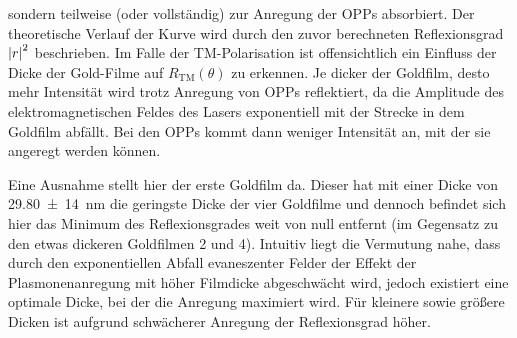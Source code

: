 sondern teilweise (oder vollständig) zur Anregung der OPPs absorbiert. Der theoretische Verlauf der Kurve wird durch den zuvor berechneten Reflexionsgrad $\abs{r}^2$ beschrieben. Im Falle der TM-Polarisation ist offensichtlich ein Einfluss der Dicke der Gold-Filme auf $R_{\mathrm{TM}}(\theta)$
zu erkennen. Je dicker der Goldfilm, desto mehr Intensität wird trotz Anregung von OPPs reflektiert, da die Amplitude des elektromagnetischen Feldes des Lasers exponentiell mit der Strecke in
dem Goldfilm abfällt. Bei den OPPs kommt dann weniger Intensität an, mit der sie angeregt werden können. \par 
Eine Ausnahme stellt hier der erste Goldfilm da. Dieser
hat mit einer Dicke von \SI{29,80(14)}{\nm} die geringste Dicke der vier Goldfilme und dennoch befindet sich hier das Minimum des Reflexionsgrades weit von null entfernt
(im Gegensatz zu den etwas dickeren Goldfilmen 2 und 4). Intuitiv liegt die Vermutung nahe, dass durch den exponentiellen Abfall evaneszenter 
Felder der Effekt der Plasmonenanregung mit höher Filmdicke abgeschwächt wird, jedoch existiert eine optimale Dicke, bei der die Anregung maximiert wird. 
Für kleinere sowie größere Dicken ist aufgrund schwächerer Anregung der Reflexionsgrad höher.